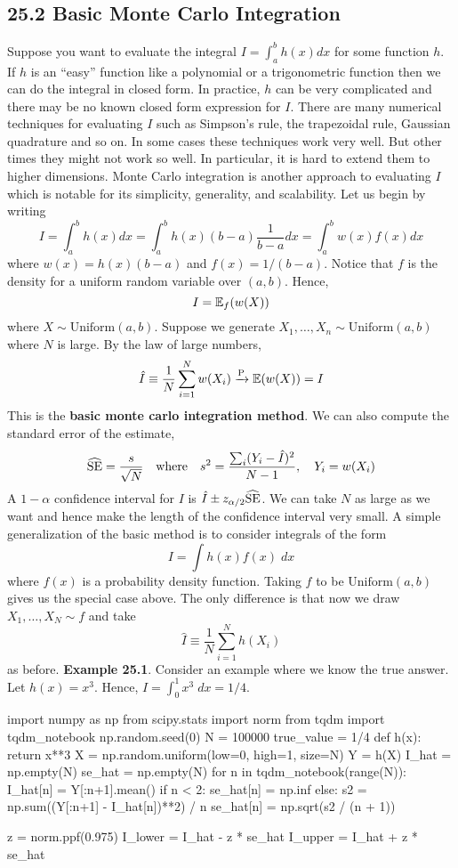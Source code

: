 \subsection*{25.2 Basic Monte Carlo Integration}\label{basic-monte-carlo-integration}
Suppose you want to evaluate the integral \(I = \int_a^{b} h(x) dx\) for
some function \(h\). If \(h\) is an ``easy'' function like a polynomial
or a trigonometric function then we can do the integral in closed form.
In practice, \(h\) can be very complicated and there may be no known
closed form expression for \(I\). There are many numerical techniques
for evaluating \(I\) such as Simpson's rule, the trapezoidal rule,
Gaussian quadrature and so on. In some cases these techniques work very
well. But other times they might not work so well. In particular, it is
hard to extend them to higher dimensions. Monte Carlo integration is
another approach to evaluating \(I\) which is notable for its
simplicity, generality, and scalability.
Let us begin by writing
\[
I = \int_a^{b} h(x) dx = \int_a^{b} h(x) (b - a) \frac{1}{b - a} dx = \int_a^{b} w(x) f(x) dx
\]
where \(w(x) = h(x)(b - a)\) and \(f(x) = 1 / (b - a)\). Notice that
\(f\) is the density for a uniform random variable over \((a, b)\).
Hence,
\[
I = \operatorname{\mathbb{E}}_f(w(X))
\]
where \(X \sim \text{Uniform}(a, b)\).
Suppose we generate \(X_{1}, \dots, X_{n} \sim \text{Uniform}(a, b)\) where
\(N\) is large. By the law of large numbers,
\[
\hat{I} \equiv \frac{1}{N} \sum_{i=1}^N w(X_{i}) \xrightarrow{\textrm{P}} \operatorname{\mathbb{E}}(w(X)) = I
\]
This is the \textbf{basic monte carlo integration method}. We can also
compute the standard error of the estimate,
\[
\widehat{\operatorname{\mathrm{SE}}} = \frac{s}{\sqrt{N}} 
\quad \text{where} \quad
s^{2} = \frac{\sum_{i} (Y_{i} - \hat{I})^{2}}{N - 1},
\quad Y_{i} = w(X_{i})
\]
A \(1 - \alpha\) confidence interval for \(I\) is
\(\hat{I} \pm z_{\alpha / 2} \widehat{\operatorname{\mathrm{SE}}}\). We can take \(N\) as
large as we want and hence make the length of the confidence interval
very small.
A simple generalization of the basic method is to consider integrals of
the form
\[
I = \int h(x) f(x) \; dx
\]
where \(f(x)\) is a probability density function. Taking \(f\) to be
\(\text{Uniform}(a, b)\) gives us the special case above. The only
difference is that now we draw \(X_{1}, \dots, X_N \sim f\) and take
\[
\hat{I} \equiv \frac{1}{N} \sum_{i=1}^N h(X_{i})
\]
as before.
\textbf{Example 25.1}. Consider an example where we know the
true answer. Let \(h(x) = x^{3}\). Hence, \(I = \int_{0}^{1} x^{3}\;dx = 1/4\).

\begin{python}
import numpy as np
from scipy.stats import norm
from tqdm import tqdm_notebook
np.random.seed(0)
N = 100000
true_value = 1/4
def h(x):
    return x**3
X = np.random.uniform(low=0, high=1, size=N)
Y = h(X)
I_hat = np.empty(N)
se_hat = np.empty(N)
for n in tqdm_notebook(range(N)):
    I_hat[n] = Y[:n+1].mean()
    if n < 2:
        se_hat[n] = np.inf
    else:
        s2 = np.sum((Y[:n+1] - I_hat[n])**2) / n
        se_hat[n] = np.sqrt(s2 / (n + 1))
        
z = norm.ppf(0.975)
I_lower = I_hat - z * se_hat
I_upper = I_hat + z * se_hat
\end{python}

